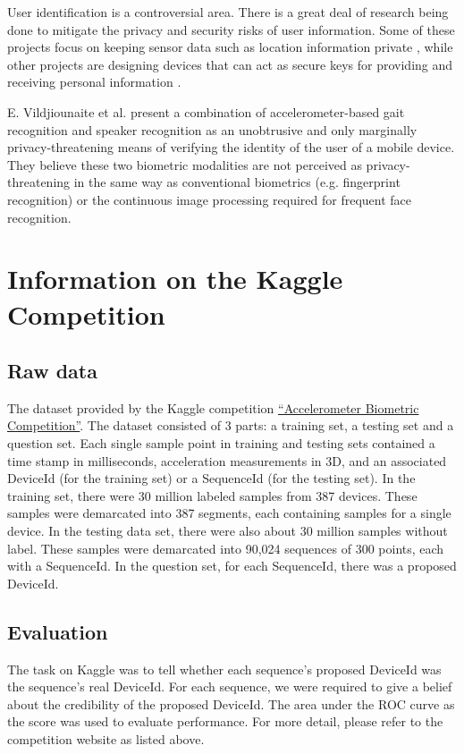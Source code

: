 \documentclass{article} %
\begin{document}
User identification is a controversial area. There is a great deal of research being done to mitigate the privacy and security risks of user information. Some of these projects focus on keeping sensor data such as location information private \cite{Cho:ISA2004}, while other projects are designing devices that can act as secure keys for providing and receiving personal information \cite{Zhu:PCC2006}. 

E. Vildjiounaite et al.\cite{Vildjiounaite:PC2006} present a combination of accelerometer-based gait recognition and speaker recognition as an unobtrusive and only marginally privacy-threatening means of verifying the identity of the user of a mobile device. They believe these two biometric modalities are not perceived as privacy-threatening in the same way as conventional biometrics (e.g. fingerprint recognition) or the continuous image processing required for frequent face recognition.

\section{Information on the Kaggle Competition}
\subsection{Raw data}
The dataset provided by the Kaggle competition \href{http://www.kaggle.com/c/accelerometer-biometric-competition}{``Accelerometer Biometric Competition''}. The dataset consisted of 3 parts: a training set, a testing set and a question set. Each single sample point in training and testing sets contained a time stamp in milliseconds, acceleration measurements in 3D, and an associated DeviceId (for the training set) or a SequenceId (for the testing set). In the training set, there were 30 million labeled samples from 387 devices. These samples were demarcated into 387 segments, each containing samples for a single device. In the testing data set, there were also about 30 million samples without label. These samples were demarcated into 90,024 sequences of 300 points, each with a SequenceId. In the question set, for each SequenceId, there was a proposed DeviceId.

\subsection{Evaluation}
The task on Kaggle was to tell whether each sequence's proposed DeviceId was the sequence's real DeviceId. For each sequence, we were required to give a belief about the credibility of the proposed DeviceId. The area under the ROC curve as the score was used to evaluate performance. For more detail, please refer to the competition website as listed above.
\end{document}
